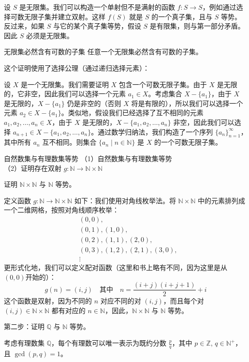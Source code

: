 \documentclass[lang=cn,11pt]{elegantbook}
\begin{document}
设 $S$ 是无限集。我们可以构造一个单射但不是满射的函数 $f: S \to S$，例如通过选择可数无限子集并建立双射。这样 $f(S)$ 就是 $S$ 的一个真子集，且与 $S$ 等势。反过来，如果 $S$ 与它的某个真子集等势，假设 $S$ 是有限集，则与第一部分矛盾。因此 $S$ 必须是无限集。
\begin{theorem}{无限集必然含有可数的子集}
    任意一个无限集必然含有可数的子集。
\end{theorem}
这个证明使用了选择公理（通过递归选择元素）：

设 $X$ 是一个无限集。我们需要证明 $X$ 包含一个可数无限子集。由于 $X$ 是无限的，它非空，因此我们可以选择一个元素 $a_1 \in X$。考虑集合 $X -\{a_1\}$，由于 $X$ 是无限的，$X - \{a_1\}$ 仍是非空的（否则 $X$ 将是有限的），所以我们可以选择一个元素 $a_2 \in X - \{a_1\}$。类似地，假设我们已经选择了互不相同的元素 $a_1, a_2, \dots, a_n \in X$，由于 $X$ 是无限的，$X- \{a_1, a_2, \dots, a_n\}$ 非空，因此我们可以选择 $a_{n+1} \in X-\{a_1, a_2, \dots, a_n\}$。通过数学归纳法，我们构造了一个序列 $\{a_n\}_{n=1}^\infty$，其中所有 $a_n$ 互不相同。则集合 $\{a_n \mid n \in \mathbb{N}\}$ 是 $X$ 的一个可数无限子集。
\begin{theorem}{自然数集与有理数集等势}
    （1）自然数集与有理数集等势\\ 
    （2）证明存在双射 $g: \mathbb{N} \to \mathbb{N} \times \mathbb{N}$
\end{theorem}
证明 $\mathbb{N} \times \mathbb{N}$ 与 $\mathbb{N}$ 等势。

定义函数 $g: \mathbb{N} \to \mathbb{N} \times \mathbb{N}$ 如下：我们使用对角线枚举法。将 $\mathbb{N} \times \mathbb{N}$ 中的元素排列成一个二维网格，按照对角线顺序枚举：
\begin{align*}
&(0,0), \\
&(0,1), (1,0), \\
&(0,2), (1,1), (2,0), \\
&(0,3), (1,2), (2,1), (3,0), \\
&\vdots
\end{align*}
更形式化地，我们可以定义配对函数（这里和书上略有不同，因为这里是从$(0,0)$开始的）：
\[
g(n) = (i,j) \quad \text{其中} \quad n = \frac{(i+j)(i+j+1)}{2} + i
\]
这个函数是双射，因为不同的 $n$ 对应不同的对 $(i,j)$，而且每个对 $(i,j) \in \mathbb{N} \times \mathbb{N}$ 都有对应的 $n \in \mathbb{N}$，因此，$\mathbb{N} \times \mathbb{N}$ 与 $\mathbb{N}$ 等势。

第二步：证明 $\mathbb{Q}$ 与 $\mathbb{N}$ 等势。

考虑有理数集 $\mathbb{Q}$，每个有理数可以唯一表示为既约分数 $\frac{p}{q}$，其中 $p \in \mathbb{Z}$, $q \in \mathbb{N}^+$，且 $\gcd(p,q) = 1$。
\end{document}
